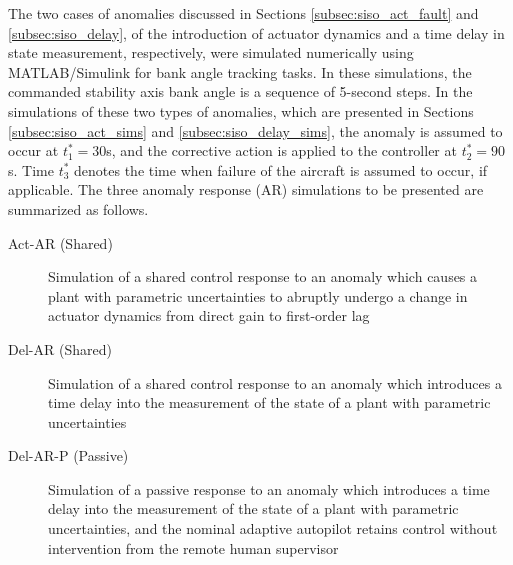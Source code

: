 The two cases of anomalies discussed in Sections \ref{subsec:siso_act_fault} and \ref{subsec:siso_delay}, of the introduction of actuator dynamics and a time delay in state measurement, respectively, were simulated numerically using MATLAB/Simulink for bank angle tracking tasks. In these simulations, the commanded stability axis bank angle is a sequence of 5-second steps. In the simulations of these two types of anomalies, which are presented in Sections \ref{subsec:siso_act_sims} and \ref{subsec:siso_delay_sims}, the anomaly is assumed to occur at $t_1^* = 30$s, and the corrective action is applied to the controller at $t_2^* = 90$s. Time $t_3^*$ denotes the time when failure of the aircraft is assumed to occur, if applicable. The three anomaly response (AR) simulations to be presented are summarized as follows.
\begin{description}
	\item[Act-AR (Shared)] Simulation of a shared control response to an anomaly which causes a plant with parametric uncertainties to abruptly undergo a change in actuator dynamics from direct gain to first-order lag
	\item[Del-AR (Shared)] Simulation of a shared control response to an anomaly which introduces a time delay into the measurement of the state of a plant with parametric uncertainties
	\item[Del-AR-P (Passive)] Simulation of a passive response to an anomaly which introduces a time delay into the measurement of the state of a plant with parametric uncertainties, and the nominal adaptive autopilot retains control without intervention from the remote human supervisor
\end{description}

